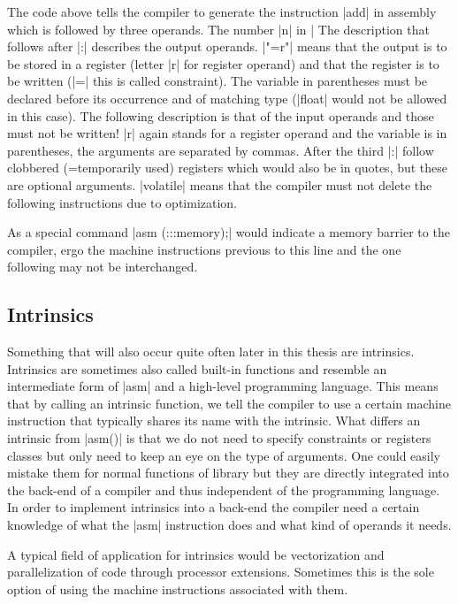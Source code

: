 The code above tells the compiler to generate the instruction |add| in assembly which is followed by three operands.
The number |n| in |%
The description that follows after |:| describes the output operands.
|"=r"| means that the output is to be stored in a register (letter |r| for register operand) and that the register is to be written (|=| this is called constraint).
The variable in parentheses must be declared before its occurrence and of matching type (|float| would not be allowed in this case).
The following description is that of the input operands and those must not be written!
|r| again stands for a register operand and the variable is in parentheses, the arguments are separated by commas.
After the third |:| follow clobbered (=temporarily used) registers which would also be in quotes, but these are optional arguments.
|volatile| means that the compiler must not delete the following instructions due to optimization.

As a special command |asm (:::memory);| would indicate a memory barrier to the compiler, ergo the machine instructions previous to this line and the one following may not be interchanged.

\subsection{Intrinsics}
Something that will also occur quite often later in this thesis are intrinsics.
Intrinsics are sometimes also called built-in functions and resemble an intermediate form of |asm| and a high-level programming language.
This means that by calling an intrinsic function, we tell the compiler to use a certain machine instruction that typically shares its name with the intrinsic.
What differs an intrinsic from |asm()| is that we do not need to specify constraints or registers classes but only need to keep an eye on the type of arguments.
One could easily mistake them for normal functions of library but they are directly integrated into the back-end of a compiler and thus independent of the programming language.
In order to implement intrinsics into a back-end the compiler need a certain knowledge of what the |asm| instruction does and what kind of operands it needs.

A typical field of application for intrinsics would be vectorization and parallelization of code through processor extensions.
Sometimes this is the sole option of using the machine instructions associated with them.

